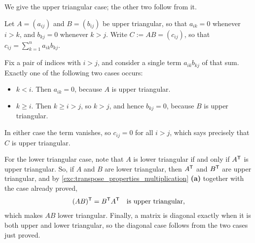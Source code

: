 \begin{exercisesolution}
\label{sol:triangular_multiplication_closure}
We give the upper triangular case; the other two follow from it.

Let $A = (a_{ij})$ and $B = (b_{ij})$ be upper triangular, so that $a_{ik} = 0$ whenever $i > k$, and $b_{kj} = 0$ whenever $k > j$. Write $C := AB = (c_{ij})$, so that $c_{ij} = \sum_{k=1}^{n} a_{ik} b_{kj}$.

Fix a pair of indices with $i > j$, and consider a single term $a_{ik} b_{kj}$ of that sum. Exactly one of the following two cases occurs:
\begin{itemize}
    \item $k < i$. Then $a_{ik} = 0$, because $A$ is upper triangular.
    \item $k \ge i$. Then $k \ge i > j$, so $k > j$, and hence $b_{kj} = 0$, because $B$ is upper triangular.
\end{itemize}
In either case the term vanishes, so $c_{ij} = 0$ for all $i > j$, which says precisely that $C$ is upper triangular.

For the lower triangular case, note that $A$ is lower triangular if and only if $A^{\mathsf{T}}$ is upper triangular. So, if $A$ and $B$ are lower triangular, then $A^{\mathsf{T}}$ and $B^{\mathsf{T}}$ are upper triangular, and by \cref{exc:transpose_properties_multiplication} \textbf{(a)} together with the case already proved,
\[
(AB)^{\mathsf{T}} = B^{\mathsf{T}} A^{\mathsf{T}} \quad \text{is upper triangular,}
\]
which makes $AB$ lower triangular. Finally, a matrix is diagonal exactly when it is both upper and lower triangular, so the diagonal case follows from the two cases just proved.
\end{exercisesolution}



